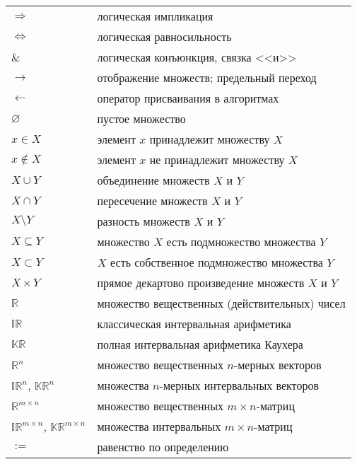 \documentclass[a5paper,openany]{book}
\newcommand{\mbb}{\mathbb}
\begin{document}
  
{\tabcolsep=4pt 
\begin{longtable}[c]{ll}
$\Rightarrow$ & логическая импликация                              \\[3pt]
$\Leftrightarrow$ & логическая равносильность                      \\[3pt]
$\&$      &   логическая конъюнкция, связка <<и>>                  \\[3pt]
$\rightarrow$ &  отображение множеств; предельный переход          \\[3pt] 
$\leftarrow$  &  оператор присваивания в алгоритмах                \\[8pt] 
$\varnothing$ & пустое множество                                   \\[3pt]
$x\in X$  &   элемент $x$ принадлежит множеству $X$                \\[3pt]
$x\not\in X$& элемент $x$ не принадлежит множеству $X$             \\[3pt]
$X\cup Y$   & объединение множеств $X$ и $Y$                       \\[3pt]
$X\cap Y$   & пересечение множеств $X$ и $Y$                       \\[3pt]
$X\setminus Y$ & разность множеств $X$ и $Y$                       \\[3pt]
$X\subseteq Y$ & множество $X$ есть подмножество множества $Y$     \\[3pt]
$X\subset Y$   & $X$ есть собственное подмножество множества $Y$   \\[3pt] 
$X\times Y$ & прямое декартово произведение множеств $X$ и $Y$     \\[8pt]
$\mbb{R}$  &   множество вещественных (действительных) чисел       \\[3pt]
$\mbb{IR}$ &   классическая интервальная арифметика                \\[3pt]
$\mbb{KR}$ &   полная интервальная арифметика Каухера              \\[3pt]
$\mbb{R}^n$ &  множество вещественных $n$-мерных векторов          \\[3pt]
$\mbb{IR}^n$, $\mbb{KR}^n$ 
             & множества $n$-мерных интервальных векторов          \\[3pt]
$\mbb{R}^{m\times n}$ & множество вещественных $m\times n$-матриц  \\[3pt]
$\mbb{IR}^{m\times n}$, $\mbb{KR}^{m\times n}$   
                       & множества интервальных $m\times n$-матриц \\[8pt]
$:=     $     &  равенство по определению                          \\[3pt]

\end{longtable}}
\end{document}
